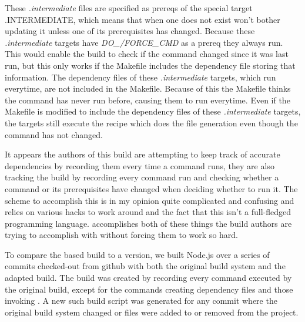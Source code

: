 These \emph{.intermediate} files are specified as prereqs of the special \Make target {.INTERMEDIATE}, which means that when one does not exist \Make won't bother updating it unless one of its prerequisites has changed.  Because these \emph{.intermediate} targets have \emph{DO\_/FORCE\_CMD} as a prereq they always run.  This would enable the build to check if the command changed since it was last run, but this only works if the Makefile includes the dependency file storing that information.  The dependency files of these \emph{.intermediate} targets, which run everytime, are not included in the Makefile.  Because of this the Makefile thinks the command has never run before, causing them to run everytime.  Even if the Makefile is modified to include the dependency files of these \emph{.intermediate} targets, the targets still execute the recipe which does the file generation even though the command has not changed. %


It appears the authors of this build are attempting to keep track of accurate dependencies by recording them every time a command runs, they are also tracking the build by recording every command run and checking whether a command or its prerequisites have changed when deciding whether to run it.  The scheme to accomplish this is in my opinion quite complicated and confusing and relies on various hacks to work around \Make and the fact that this isn't a full-fledged programming language.  \Rattle accomplishes both of these things the build authors are trying to accomplish with \Make without forcing them to work so hard.

To compare the \Make based build to a \Rattle version, we built Node.js over a series of commits checked-out from github with both the original build system and the adapted \Rattle build.  The \Rattle build was created by recording every command executed by the original build, except for the commands creating dependency files and those invoking \Make.  A new such \Rattle build script was generated for any commit where the original build system changed or files were added to or removed from the project.





